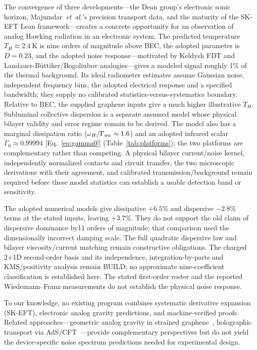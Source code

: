 \documentclass[aps,prd,twocolumn,showpacs,superscriptaddress,nofootinbib]{revtex4-2}
\begin{document}
The convergence of three developments---the Dean group's electronic sonic
horizon, Majumdar~\textit{et~al.}'s precision transport data, and the
maturity of the SK-EFT Lean framework---creates a concrete opportunity for
an observation of analog Hawking radiation in an electronic system.
The predicted temperature $T_H \approx \SI{2.4}{\kelvin}$ is nine orders
of magnitude above BEC, the adopted parameter is $D = 0.23$, and the
adopted noise response---motivated by Keldysh FDT and
Landauer-B\"uttiker/Bogoliubov analogies---gives a modeled signal roughly 1\%
of the thermal background. Its ideal radiometer estimates assume Gaussian
noise, independent frequency bins, the adopted electrical response and a
specified bandwidth; they supply no calibrated statistics-versus-systematics
boundary. Relative to BEC, the supplied graphene inputs give a much higher
illustrative $T_H$. Subluminal collective dispersion is a separate assumed
model whose physical bilayer validity and error regime remain to be derived.
The model also has a marginal dissipation ratio
($\omega_H/\Gamma_{\rm mr} \approx 1.6$) and
an adopted infrared scalar $\Gamma_0 \approx 0.99994$
[Eq.~\eqref{eq:gamma0}] (Table~\ref{tab:platforms}); the
two platforms are complementary rather than competing. A physical bilayer
current/noise kernel, independently normalized contacts and circuit transfer,
the two microscopic derivations with their agreement, and calibrated
transmission/background remain required before these model statistics
can establish a usable detection band or sensitivity.

The adopted numerical models give dissipative $+6.5\%$ and dispersive
$-2.8\%$ terms at the stated inputs, leaving $+3.7\%$. They do not
support the old claim of dispersive dominance by11 orders of magnitude;
that comparison used the dimensionally incorrect damping scale. The full
quadratic dispersive law and bilayer viscosity/current matching remain
constructive obligations. The charged 2+1D second-order basis
and its independence, integration-by-parts and KMS/positivity analysis
remain BUILD; no approximate nine-coefficient classification is
established here. The stated first-order roster and the reported
Wiedemann--Franz measurements do not establish the physical noise response.

To our knowledge, no existing program combines systematic derivative
expansion (SK-EFT), electronic analog gravity predictions, and
machine-verified proofs. Related approaches---geometric analog gravity
in strained graphene~\cite{Iorio2012}, holographic transport via
AdS/CFT~\cite{KSS2005}---provide complementary perspectives but do not
yield the device-specific noise spectrum predictions needed for
experimental design.
\end{document}
